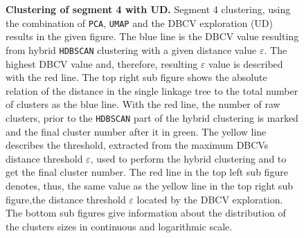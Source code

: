 \begin{figure}[!htb]
\begin{subfigure}[b]{0.475\textwidth}
    \end{subfigure}
    \caption[Clustering of segment 4 with UD]{\textbf{Clustering of segment 4 with UD.} Segment 4 clustering, using the combination of \texttt{PCA}, \texttt{UMAP} and the \gls{DBCV} exploration (UD) results in the given figure. The blue line is the \gls{DBCV} value resulting from hybrid \texttt{HDBSCAN} clustering with a given distance value $\varepsilon$. The highest \gls{DBCV} value and, therefore, resulting $\varepsilon$ value is described with the red line. The top right sub figure shows the absolute relation of the distance in the single linkage tree to the total number of clusters as the blue line. With the red line, the number of raw clusters, prior to the \texttt{HDBSCAN} part of the hybrid clustering is marked and the final cluster number after it in green. The yellow line describes the threshold, extracted from the maximum \glspl{DBCV} distance threshold $\varepsilon$, used to perform the hybrid clustering and to get the final cluster number. The red line in the top left sub figure denotes, thus, the same value as the yellow line in the top right sub figure,the distance threshold $\varepsilon$ located by the \gls{DBCV} exploration. The bottom sub figures give information about the distribution of the clusters sizes in continuous and logarithmic scale.}
    \label{fig:UMAP_Cluster_DBCV_4}
\end{figure}

\FloatBarrier
\newpage

